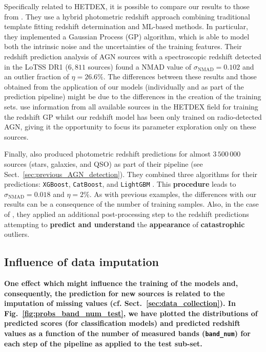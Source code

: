 \documentclass{aa}
\begin{document}
Specifically related to HETDEX, it is possible to compare our results to those from \citet{2019A&A...622A...3D}. They use a hybrid photometric redshift approach combining  traditional template fitting redshift determination and ML-based methods. In particular, they implemented a Gaussian Process (GP) algorithm, which is able to model both the intrinsic noise and the uncertainties of the training features. Their redshift prediction analysis of 
AGN sources with a spectroscopic redshift detected in the LoTSS DR1 ($6,811$ sources) found a NMAD value of ${\sigma_{\mathrm{NMAD}} = 0.102}$ and an outlier fraction of ${\eta = 26.6 \%}$.
The differences between these results and those obtained from the application of our models (individually and as part of the prediction pipeline) might be due to the differences in the creation of the training sets. \citet{2019A&A...622A...3D} use information from all available sources in the HETDEX field for training the redshift GP whilst our redshift model has been only trained on radio-detected AGN, giving it the opportunity to focus its parameter exploration only on these sources.

Finally, \citet{2022A&A...666A..87C} also produced photometric redshift predictions for almost $3\,500\,000$ sources (stars, galaxies, and QSO) as part of their pipeline (see Sect.~\ref{sec:previous_AGN_detection}). They combined three algorithms for their predictions: \texttt{XGBoost}, \texttt{CatBoost}, and \texttt{LightGBM} \citep{NIPS2017_6449f44a}. This \textbf{procedure} leads to ${\sigma_{\mathrm{NMAD}} = 0.018}$ and ${\eta = 2 \%}$. As with previous examples, the differences with our results can be a consequence of the number of training samples. Also, in the case of \citet{2022A&A...666A..87C}, they applied an additional post-processing step to the redshift predictions attempting to \textbf{predict and understand} the \textbf{appearance} of \textbf{catastrophic} outliers.

\subsection{Influence of data imputation}\label{sec:band_num_trends}

\textbf{One effect which might influence the training of the models and, consequently, the prediction for new sources is related to the imputation of missing values (cf. Sect.~\ref{sec:data_collection}). In Fig.~\ref{fig:probs_band_num_test}, we have plotted the distributions of predicted scores (for classification models) and predicted redshift values as a function of the number of measured bands (\texttt{band\_num}) for each step of the pipeline as applied to the test sub-set.}
\end{document}
